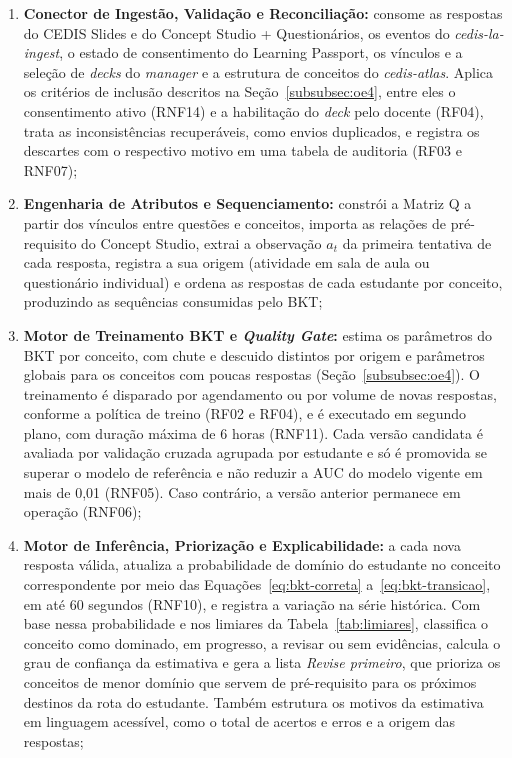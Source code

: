 \begin{enumerate}
    \item \textbf{Conector de Ingestão, Validação e Reconciliação:} consome as respostas do CEDIS Slides e do Concept Studio + Questionários, os eventos do \textit{cedis-la-ingest}, o estado de consentimento do Learning Passport, os vínculos e a seleção de \textit{decks} do \textit{manager} e a estrutura de conceitos do \textit{cedis-atlas}. Aplica os critérios de inclusão descritos na Seção~\ref{subsubsec:oe4}, entre eles o consentimento ativo (RNF14) e a habilitação do \textit{deck} pelo docente (RF04), trata as inconsistências recuperáveis, como envios duplicados, e registra os descartes com o respectivo motivo em uma tabela de auditoria (RF03 e RNF07);
    \item \textbf{Engenharia de Atributos e Sequenciamento:} constrói a Matriz Q a partir dos vínculos entre questões e conceitos, importa as relações de pré-requisito do Concept Studio, extrai a observação $a_t$ da primeira tentativa de cada resposta, registra a sua origem (atividade em sala de aula ou questionário individual) e ordena as respostas de cada estudante por conceito, produzindo as sequências consumidas pelo BKT;
    \item \textbf{Motor de Treinamento BKT e \textit{Quality Gate}:} estima os parâmetros do BKT por conceito, com chute e descuido distintos por origem e parâmetros globais para os conceitos com poucas respostas (Seção~\ref{subsubsec:oe4}). O treinamento é disparado por agendamento ou por volume de novas respostas, conforme a política de treino (RF02 e RF04), e é executado em segundo plano, com duração máxima de 6 horas (RNF11). Cada versão candidata é avaliada por validação cruzada agrupada por estudante e só é promovida se superar o modelo de referência e não reduzir a AUC do modelo vigente em mais de 0,01 (RNF05). Caso contrário, a versão anterior permanece em operação (RNF06);
    \item \textbf{Motor de Inferência, Priorização e Explicabilidade:} a cada nova resposta válida, atualiza a probabilidade de domínio do estudante no conceito correspondente por meio das Equações~\ref{eq:bkt-correta} a~\ref{eq:bkt-transicao}, em até 60 segundos (RNF10), e registra a variação na série histórica. Com base nessa probabilidade e nos limiares da Tabela~\ref{tab:limiares}, classifica o conceito como dominado, em progresso, a revisar ou sem evidências, calcula o grau de confiança da estimativa e gera a lista \textit{Revise primeiro}, que prioriza os conceitos de menor domínio que servem de pré-requisito para os próximos destinos da rota do estudante. Também estrutura os motivos da estimativa em linguagem acessível, como o total de acertos e erros e a origem das respostas;

\end{enumerate}
